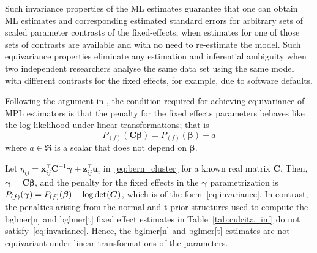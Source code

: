 \documentclass[11pt, a4paper]{article}
\newcommand*{\bb}{\boldsymbol}
\theoremstyle{example} \newtheorem{example}{Example}[section]
\theoremstyle{theorem} \newtheorem{theorem}{Theorem}[section]
\def\det{{\mathop{\rm det}}}
\def\bbeta{\bb{\beta}}
\def\bgamma{\bb{\gamma}}
\def\bgamma{\bb{\gamma}}
\def\bC{\bb{C}}
\def\bu{\bb{u}}
\def\bx{\bb{x}}
\def\bz{\bb{z}}
\begin{document}
Such invariance properties of the ML estimates guarantee that one can
obtain ML estimates and corresponding estimated standard errors for
arbitrary sets of scaled parameter contrasts of the fixed-effects,
when estimates for one of those sets of contrasts are available and
with no need to re-estimate the model. Such equivariance properties
eliminate any estimation and inferential ambiguity when two
independent researchers analyse the same data set using the same model
with different contrasts for the fixed effects, for example, due to
software defaults.

Following the argument in \citet{zehna:1966}, the
condition required for achieving equivariance of MPL estimators is that
the penalty for the fixed effects parameters behaves like the
log-likelihood under linear transformations; that is
\begin{equation}
  \label{eq:invariance}
  P_{(f)}(\bC\bbeta) = P_{(f)}(\bbeta) + a
\end{equation}
where $a \in \Re$ is a scalar that does not depend on $\bbeta$.

Let $\eta_{ij} = \bx_{ij}^\top \bC^{-1} \bgamma + \bz_{ij}^\top \bu_i$
in~\eqref{eq:bern_cluster} for a known real matrix $\bC$. Then,
$\bgamma = \bC\bbeta$, and the penalty for the fixed effects in the
$\bgamma$ parametrization is
$P_{(f)}(\bgamma) = P_{(f)}(\bbeta) - \log \det (\bC)$, which is of
the form~\eqref{eq:invariance}. In contrast, the penalties arising
from the normal and t prior structures used to compute the bglmer[n]
and bglmer[t] fixed effect estimates in Table~\ref{tab:culcita_inf} do
not satisfy~\eqref{eq:invariance}. Hence, the bglmer[n] and bglmer[t]
estimates are not equivariant under linear transformations of the
parameters.
\end{document}
